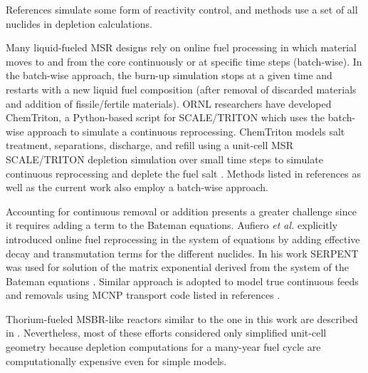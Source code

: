 References 
\cite{doligez_coupled_2014,heuer_towards_2014,sheu_depletion_2013,aufiero_extended_2013} 
simulate some form of reactivity control, and methods 
\cite{doligez_coupled_2014,heuer_towards_2014,aufiero_extended_2013,ahmad_neutronics_2015, 
park_whole_2015, 
jeong_equilibrium_2016,rykhlevskii_online_2017,nuttin_potential_2005} use a set 
of all nuclides in depletion calculations. 

Many liquid-fueled \gls{MSR} designs rely on online fuel processing in which  
material moves to and from the core continuously or at specific time steps 
(batch-wise). In the batch-wise approach, the burn-up simulation stops at a given 
time and restarts with a new liquid fuel composition (after removal of discarded 
materials and addition of fissile/fertile materials). \gls{ORNL} researchers 
have developed ChemTriton, a Python-based script for SCALE/TRITON which uses the 
batch-wise approach to simulate a continuous reprocessing. ChemTriton models salt 
treatment, separations, discharge, and refill using a unit-cell \gls{MSR} 
SCALE/TRITON depletion simulation over small time steps to simulate continuous 
reprocessing and deplete the fuel salt \cite{powers_new_2013}. Methods listed in 
references \cite{fiorina_investigation_2013,sheu_depletion_2013,park_whole_2015, 
jeong_equilibrium_2016,powers_inventory_2014,betzler_molten_2017,rykhlevskii_online_2017} 
as well as the current work also employ a batch-wise approach.

Accounting for continuous removal or addition presents a greater challenge since it 
requires adding a term to the Bateman equations. Aufiero \emph{et al.} explicitly
introduced online fuel reprocessing in the system of equations by adding effective 
decay and transmutation terms for the different nuclides. In his work SERPENT was 
used for solution of the matrix exponential derived from the system of the Bateman 
equations \cite{aufiero_extended_2013}. Similar approach is adopted to model true 
continuous feeds and removals using MCNP transport code listed in references 
\cite{doligez_coupled_2014,heuer_towards_2014,nuttin_potential_2005}.

Thorium-fueled \gls{MSBR}-like reactors similar to the one in this work are 
described in \cite{park_whole_2015, 
jeong_equilibrium_2016,powers_new_2013,powers_inventory_2014, 
betzler_molten_2017,rykhlevskii_online_2017,nuttin_potential_2005}. 
Nevertheless, most of these efforts considered only simplified unit-cell 
geometry because depletion computations for a many-year fuel cycle are 
computationally expensive even for simple models. 

